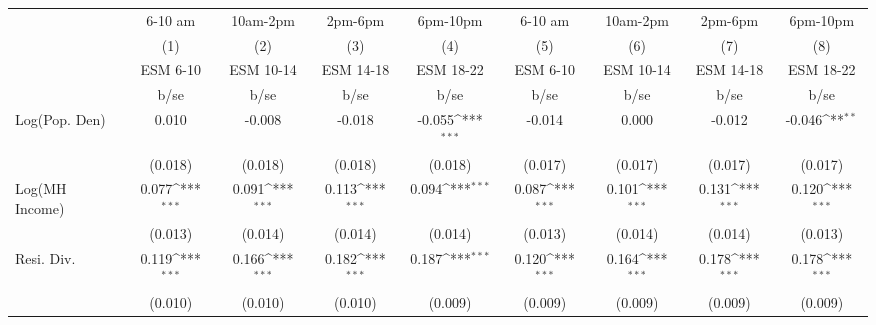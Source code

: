 {
\def\sym#1{\ifmmode^{#1}\else\(^{#1}\)\fi}
\begin{tabular}{l*{8}{c}}
\toprule
                    &\multicolumn{1}{c}{6-10 am}&\multicolumn{1}{c}{10am-2pm}&\multicolumn{1}{c}{2pm-6pm}&\multicolumn{1}{c}{6pm-10pm}&\multicolumn{1}{c}{6-10 am}&\multicolumn{1}{c}{10am-2pm}&\multicolumn{1}{c}{2pm-6pm}&\multicolumn{1}{c}{6pm-10pm}\\\cmidrule(lr){2-2}\cmidrule(lr){3-3}\cmidrule(lr){4-4}\cmidrule(lr){5-5}\cmidrule(lr){6-6}\cmidrule(lr){7-7}\cmidrule(lr){8-8}\cmidrule(lr){9-9}
                    &\multicolumn{1}{c}{(1)}&\multicolumn{1}{c}{(2)}&\multicolumn{1}{c}{(3)}&\multicolumn{1}{c}{(4)}&\multicolumn{1}{c}{(5)}&\multicolumn{1}{c}{(6)}&\multicolumn{1}{c}{(7)}&\multicolumn{1}{c}{(8)}\\
                    &\multicolumn{1}{c}{ESM 6-10}&\multicolumn{1}{c}{ESM 10-14}&\multicolumn{1}{c}{ESM 14-18}&\multicolumn{1}{c}{ESM 18-22}&\multicolumn{1}{c}{ESM 6-10}&\multicolumn{1}{c}{ESM 10-14}&\multicolumn{1}{c}{ESM 14-18}&\multicolumn{1}{c}{ESM 18-22}\\
                    &        b/se         &        b/se         &        b/se         &        b/se         &        b/se         &        b/se         &        b/se         &        b/se         \\
\midrule
Log(Pop. Den)       &       0.010         &      -0.008         &      -0.018         &      -0.055\sym{***}&      -0.014         &       0.000         &      -0.012         &      -0.046\sym{**} \\
                    &     (0.018)         &     (0.018)         &     (0.018)         &     (0.018)         &     (0.017)         &     (0.017)         &     (0.017)         &     (0.017)         \\
Log(MH Income)      &       0.077\sym{***}&       0.091\sym{***}&       0.113\sym{***}&       0.094\sym{***}&       0.087\sym{***}&       0.101\sym{***}&       0.131\sym{***}&       0.120\sym{***}\\
                    &     (0.013)         &     (0.014)         &     (0.014)         &     (0.014)         &     (0.013)         &     (0.014)         &     (0.014)         &     (0.013)         \\
Resi. Div.          &       0.119\sym{***}&       0.166\sym{***}&       0.182\sym{***}&       0.187\sym{***}&       0.120\sym{***}&       0.164\sym{***}&       0.178\sym{***}&       0.178\sym{***}\\
                    &     (0.010)         &     (0.010)         &     (0.010)         &     (0.009)         &     (0.009)         &     (0.009)         &     (0.009)         &     (0.009)         \\

\end{tabular}}
